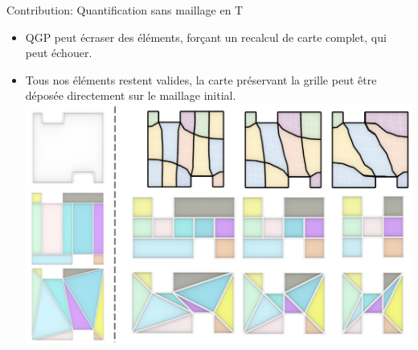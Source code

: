 \begin{frame}{Contribution: Quantification sans maillage en T}
    \begin{itemize}
        \item QGP peut écraser des éléments, forçant un recalcul de carte complet, qui peut échouer.\\
        \item Tous nos éléments restent valides, la carte préservant la grille peut être déposée directement sur le maillage initial.\\
        \centering
        \includegraphics[width=0.75\linewidth]{yoimg/restriction.png}
    \end{itemize}
\end{frame}

